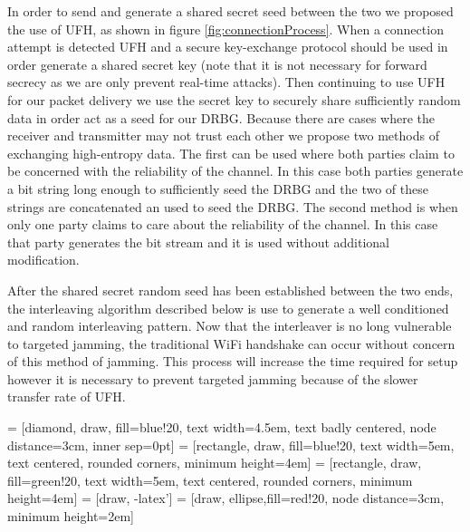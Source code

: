 \documentclass[sigconf]{acmart}
\begin{document}
In order to send and generate a shared secret seed between the two we proposed the use of UFH, as shown in figure \ref{fig:connectionProcess}. When a connection attempt is detected UFH and a secure key-exchange protocol should be used in order generate a shared secret key (note that it is not necessary for forward secrecy as we are only prevent real-time attacks). Then continuing to use UFH for our packet delivery we use the secret key to securely share sufficiently random data in order act as a seed for our DRBG. Because there are cases where the receiver and transmitter may not trust each other we propose two methods of exchanging high-entropy data. The first can be used where both parties claim to be concerned with the reliability of the channel. In this case both parties generate a bit string long enough to sufficiently seed the DRBG and the two of these strings are concatenated an used to seed the DRBG. The second method is when only one party claims to care about the reliability of the channel. In this case that party generates the bit stream and it is used without additional modification. 

After the shared secret random seed has been established between the two ends, the interleaving algorithm described below is use to generate a well conditioned and random interleaving pattern. Now that the interleaver is no long vulnerable to targeted jamming, the traditional WiFi handshake can occur without concern of this method of jamming. This process will increase the time required for setup however it is necessary to prevent targeted jamming because of the slower transfer rate of UFH\cite{strasser2008jamming}. 

 = [diamond, draw, fill=blue!20, 
    text width=4.5em, text badly centered, node distance=3cm, inner sep=0pt]
 = [rectangle, draw, fill=blue!20, 
    text width=5em, text centered, rounded corners, minimum height=4em]
 = [rectangle, draw, fill=green!20, 
    text width=5em, text centered, rounded corners, minimum height=4em]
 = [draw, -latex']
 = [draw, ellipse,fill=red!20, node distance=3cm,
    minimum height=2em]
\end{document}
